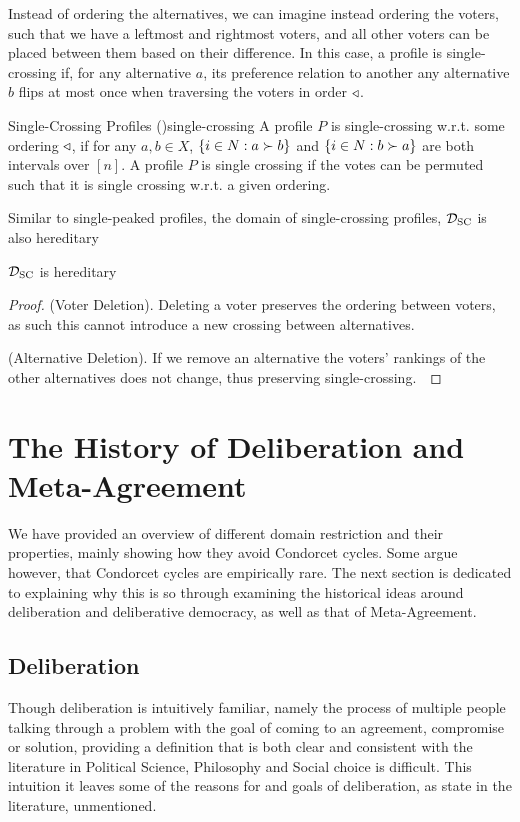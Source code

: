 Instead of ordering the alternatives, we can imagine instead ordering the voters, such that we have a leftmost and rightmost voters, and all other voters can be placed between them based on their difference. In this case, a profile is single-crossing if, for any alternative $a$, its preference relation to another any alternative $b$ flips at most once when traversing the voters in order $\triangleleft$.

\begin{definition}{Single-Crossing Profiles \textnormal{(\citet{elkindPreferenceRestrictionsComputational2022a})}}{single-crossing}
	A profile $P$ is single-crossing w.r.t. some ordering $\triangleleft$, if for any $a,b \in X$, $\{i \in N : a \succ b\}$ and $\{i \in N: b \succ a\}$ are both intervals over $[n]$. A profile $P$ is single crossing if the votes can be permuted such that it is single crossing w.r.t. a given ordering.
\end{definition}

Similar to single-peaked profiles, the domain of single-crossing profiles, $\mathcal{D}_{\textnormal{SC}}$ is also hereditary

\begin{proposition}
	$\mathcal{D}_{\textnormal{SC}}$ is hereditary
\end{proposition}

\begin{proof}
	(Voter Deletion). Deleting a voter preserves the ordering between voters, as such this cannot introduce a new crossing between alternatives.~\checkmark

	(Alternative Deletion). If we remove an alternative the voters' rankings of the other alternatives does not change, thus preserving single-crossing.~\checkmark
\end{proof}

\section{The History of Deliberation and Meta-Agreement}

We have provided an overview of different domain restriction and their properties, mainly showing how they avoid Condorcet cycles. Some argue however, that Condorcet cycles are empirically rare. The next section is dedicated to explaining why this is so through examining the historical ideas around deliberation and deliberative democracy, as well as that of Meta-Agreement.

\subsection{Deliberation}
Though deliberation is intuitively familiar, namely the process of multiple people talking through a problem with the goal of coming to an agreement, compromise or solution, providing a definition that is both clear and consistent with the literature in Political Science, Philosophy and Social choice is difficult.  This intuition it leaves some of the reasons for and goals of deliberation, as state in the literature, unmentioned.


